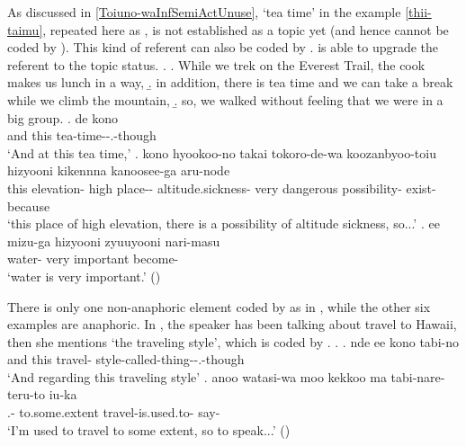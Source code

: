 As discussed in \ref{Toiuno-waInfSemiActUnuse},
`tea time' in the example \ref{thii-taimu}, repeated here as \Next, is not established as a topic yet (and hence cannot be coded by ).
This kind of referent can also be coded by .
 is able to upgrade the referent to the topic status.
%
\ex.\label{thii-taimu2}
 \a. While we trek on the Everest Trail, the cook makes us lunch in a way,
 \b. in addition, there is tea time and we can take a break while we climb the mountain,
 \b. so, we walked without feeling that we were in a big group.
 \bg. de kono  \\
		and this tea-time--.-though \\
		`And at this tea time,'
 \bg. kono hyookoo-no {takai} {tokoro-de-wa} koozanbyoo-toiu hizyooni {kikennna} {kanoosee-ga} aru-node \\
		this elevation- high place-- altitude.sickness- very dangerous possibility- exist-because \\
		`this place of high elevation, there is a possibility of altitude sickness, so...'
 \bg. ee {mizu-ga} hizyooni zyuuyooni nari-masu \\
		 water- very important become- \\
		`water is very important.'
		 \hfill{()}

There is only one non-anaphoric element coded by  as in \Next,
while the other six examples are anaphoric.
In \Next,
the speaker has been talking about travel to Hawaii,
then she mentions `the traveling style',
which is coded by .
\ex. \ag. nde ee kono tabi-no  \\
		and  this travel- style-called-thing--.-though \\
		`And regarding this traveling style'
	\bg. anoo watasi-wa moo kekkoo ma tabi-nare-teru-to iu-ka \\
		 .-  to.some.extent  travel-is.used.to- say- \\
		`I'm used to travel to some extent, so to speak...'
		\hfill{()}
%

